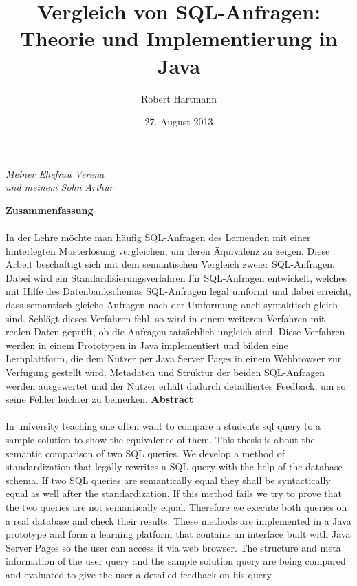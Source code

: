\documentclass[12pt]{scrreprt}
\author{Robert Hartmann}
\title{Vergleich von SQL-Anfragen: Theorie und Implementierung in Java}
\date{27. August 2013}
\theoremstyle{remark}
\begin{document}

%

\newpage
\vspace*{40mm}
\begin{center}
\textit{Meiner Ehefrau Verena\\und meinem Sohn Arthur}
\end{center}
\newpage

\onehalfspacing
\vspace*{10mm}
{\huge \textbf{Zusammenfassung}}\\\\
In der Lehre möchte man häufig SQL-Anfragen des Lernenden mit einer hinterlegten Musterlösung vergleichen, um deren Äquivalenz zu zeigen. Diese Arbeit beschäftigt sich mit dem semantischen Vergleich zweier SQL-Anfragen. Dabei wird ein Standardisierungsverfahren für SQL-Anfragen entwickelt, welches mit Hilfe des Datenbankschemas SQL-Anfragen legal umformt und dabei erreicht, dass semantisch gleiche Anfragen nach der Umformung auch syntaktisch gleich sind. Schlägt dieses Verfahren fehl, so wird in einem weiteren Verfahren mit realen Daten geprüft, ob die Anfragen tatsächlich ungleich sind. Diese Verfahren werden in einem Prototypen in Java implementiert und bilden eine Lernplattform, die dem Nutzer per Java Server Pages in einem Webbrowser zur Verfügung gestellt wird. Metadaten und Struktur der beiden SQL-Anfragen werden ausgewertet und der Nutzer erhält dadurch detailliertes Feedback, um so seine Fehler leichter zu bemerken.\newline\newline\newline\newline\newline
{\huge \textbf{Abstract}}\\\\
In university teaching one often want to compare a students sql query to a sample solution to show the equivalence of them. This thesis is about the semantic comparison of two SQL queries. We develop a method of standardization that legally rewrites a SQL query with the help of the database schema. If two SQL queries are semantically equal they shall be syntactically equal as well after the standardization. If this method fails we try to prove that the two queries are not semantically equal. Therefore we execute both queries on a real database and check their results. These methods are implemented in a Java prototype and form a learning platform that contains an interface built with Java Server Pages so the user can access it via web browser. The structure and meta information of the user query and the sample solution query are being compared and evaluated to give the user a detailed feedback on his query.
\end{document}

